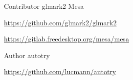 
\begin{cventries}
  \cventry
    {Contributor} %
    {glmark2 \hspace{0.2cm} Mesa} %
    {\hspace{1cm}} %
    {} %
    {
      \begin{cvitems} %
        \item {\url{https://github.com/glmark2/glmark2}}
        \item {\url{https://gitlab.freedesktop.org/mesa/mesa}}
      \end{cvitems}
    }

  \cventry
    {Author} %
    {autotry} %
    {\hspace{1cm}} %
    {} %
    {
      \begin{cvitems} %
        \item {\url{https://github.com/lucmann/autotry}}
      \end{cvitems}
    }
\end{cventries}
